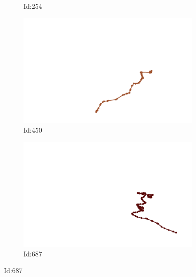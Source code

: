 \documentclass[12pt,twoside]{report}
\begin{document}
\begin{figure}
\begin{subfigure}[b]{0.20\textwidth}
\caption{Id:254}
\end{subfigure}
\begin{subfigure}[b]{0.20\textwidth}
\centering
\includegraphics[width=\textwidth]{../../trajectories/450.png}
\caption{Id:450}
\end{subfigure}
\begin{subfigure}[b]{0.20\textwidth}
\centering
\includegraphics[width=\textwidth]{../../trajectories/687.png}
\caption{Id:687}
\end{subfigure}
\end{figure}
\end{document}
